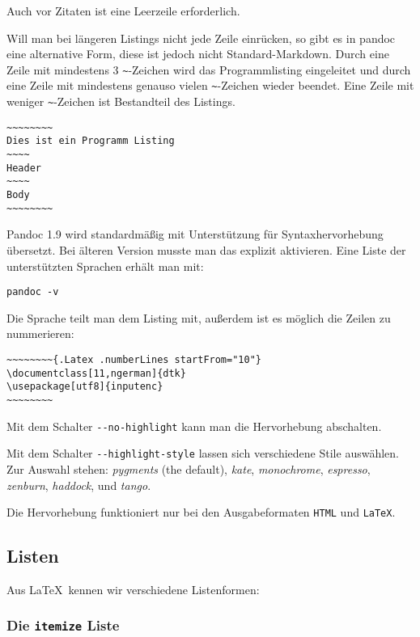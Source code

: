 \documentclass[11pt,ngerman,a4paper]{article}
\begin{document}
Auch vor Zitaten ist eine Leerzeile erforderlich.

Will man bei längeren Listings nicht jede Zeile einrücken, so gibt es in
pandoc eine alternative Form, diese ist jedoch nicht Standard-Markdown.
Durch eine Zeile mit mindestens 3 \texttt{\textasciitilde{}}-Zeichen
wird das Programmlisting eingeleitet und durch eine Zeile mit mindestens
genauso vielen \texttt{\textasciitilde{}}-Zeichen wieder beendet. Eine
Zeile mit weniger \texttt{\textasciitilde{}}-Zeichen ist Bestandteil des
Listings.

\begin{verbatim}
~~~~~~~~
Dies ist ein Programm Listing
~~~~
Header
~~~~
Body
~~~~~~~~
\end{verbatim}

Pandoc 1.9 wird standardmäßig mit Unterstützung für Syntaxhervorhebung
übersetzt. Bei älteren Version musste man das explizit aktivieren. Eine
Liste der unterstützten Sprachen erhält man mit:

\begin{verbatim}
pandoc -v
\end{verbatim}

Die Sprache teilt man dem Listing mit, außerdem ist es möglich die
Zeilen zu nummerieren:

\begin{verbatim}
~~~~~~~~{.Latex .numberLines startFrom="10"}
\documentclass[11,ngerman]{dtk}
\usepackage[utf8]{inputenc}
~~~~~~~~
\end{verbatim}

Mit dem Schalter \texttt{-{}-no-highlight} kann man die Hervorhebung
abschalten.

Mit dem Schalter \texttt{-{}-highlight-style} lassen sich verschiedene
Stile auswählen. Zur Auswahl stehen: \emph{pygments} (the default),
\emph{kate}, \emph{monochrome}, \emph{espresso}, \emph{zenburn},
\emph{haddock}, und \emph{tango}.

Die Hervorhebung funktioniert nur bei den Ausgabeformaten \texttt{HTML}
und \texttt{LaTeX}.

\subsection{Listen}

Aus LaTeX~kennen wir verschiedene Listenformen:

\subsubsection{Die \texttt{itemize} Liste}
\end{document}
